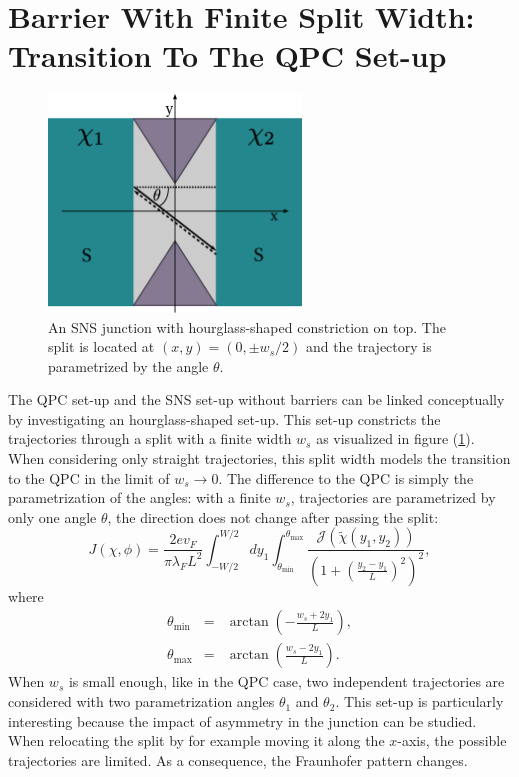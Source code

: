 \section{Barrier With Finite Split Width: Transition To The QPC Set-up}
\begin{figure}
\centering
\includegraphics[width=0.6\textwidth]{figure/analyticalmodel/hourglass_csch}
\caption{An SNS junction with hourglass-shaped constriction on top. The split is located at $(x, y) = (0, \pm w_s / 2)$ and  the trajectory is parametrized by the angle $\theta$. }\label{fig:hourglass}
\end{figure}
The QPC set-up and the SNS set-up without barriers can be linked conceptually by investigating an hourglass-shaped set-up. This set-up constricts the trajectories through a split with a finite width $w_s$ as visualized in figure (\ref{fig:hourglass}). When considering only straight trajectories, this split width models the transition to the QPC in the limit of $w_s \rightarrow 0 $. The difference to the QPC is simply the parametrization of the angles: with a finite $w_s$, trajectories are parametrized by only one angle $\theta$, the direction does not change after passing the split:
\begin{equation}
J \left( \chi, \phi \right) = \frac{2 e v_F}{\pi \lambda_F L^2} \int_{-W/2}^{W/2} d y_1 \int_{\theta_\text{min}}^{\theta_\text{max}} \frac{\mathcal{J}(\tilde{\chi} ( y_1, y_2 ) )}{\left( 1 + \left(\frac{y_2 - y_1}{L}\right)^2 \right)^2},
\end{equation}
where
\begin{eqnarray}
\theta_\text{min} &=& \arctan\left( -\frac{w_s + 2y_1}{L} \right),\\
\theta_\text{max} &=& \arctan\left( \frac{w_s - 2y_1}{L} \right).
\end{eqnarray}
When $w_s$ is small enough, like in the QPC case, two independent trajectories are considered with two parametrization angles $\theta_1$ and $\theta_2$. 
This set-up is particularly interesting because the impact of asymmetry in the junction can be studied. When relocating the split by for example moving it along the $x$-axis, the possible trajectories are limited. As a consequence, the Fraunhofer pattern changes. 
